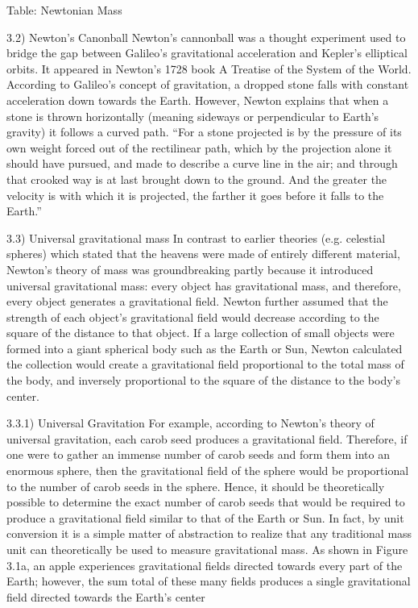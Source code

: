 \documentclass{book}
\begin{document}
    Table: Newtonian Mass
    
    3.2) Newton's Canonball
    Newton's cannonball was a thought experiment used to bridge the gap between Galileo's gravitational acceleration and Kepler's elliptical orbits. It appeared in Newton's 1728 book A Treatise of the System of the World. According to Galileo's concept of gravitation, a dropped stone falls with constant acceleration down towards the Earth. However, Newton explains that when a stone is thrown horizontally (meaning sideways or perpendicular to Earth's gravity) it follows a curved path. ``For a stone projected is by the pressure of its own weight forced out of the rectilinear path, which by the projection alone it should have pursued, and made to describe a curve line in the air; and through that crooked way is at last brought down to the ground. And the greater the velocity is with which it is projected, the farther it goes before it falls to the Earth.''
    
    3.3) Universal gravitational mass
    In contrast to earlier theories (e.g. celestial spheres) which stated that the heavens were made of entirely different material, Newton's theory of mass was groundbreaking partly because it introduced universal gravitational mass: every object has gravitational mass, and therefore, every object generates a gravitational field. Newton further assumed that the strength of each object's gravitational field would decrease according to the square of the distance to that object. If a large collection of small objects were formed into a giant spherical body such as the Earth or Sun, Newton calculated the collection would create a gravitational field proportional to the total mass of the body, and inversely proportional to the square of the distance to the body's center.
    
    3.3.1) Universal Gravitation
    For example, according to Newton's theory of universal gravitation, each carob seed produces a gravitational field. Therefore, if one were to gather an immense number of carob seeds and form them into an enormous sphere, then the gravitational field of the sphere would be proportional to the number of carob seeds in the sphere. Hence, it should be theoretically possible to determine the exact number of carob seeds that would be required to produce a gravitational field similar to that of the Earth or Sun. In fact, by unit conversion it is a simple matter of abstraction to realize that any traditional mass unit can theoretically be used to measure gravitational mass. As shown in Figure 3.1a, an apple experiences gravitational fields directed towards every part of the Earth; however, the sum total of these many fields produces a single gravitational field directed towards the Earth's center
    
\end{document}
